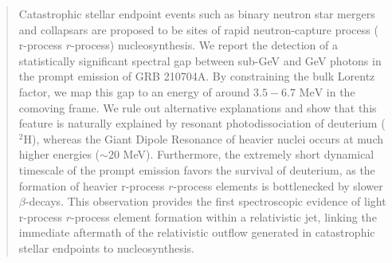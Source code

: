 \documentclass[prd,twocolumn,amsmath,amssymb,aps,linenumbers]{revtex4-2} %
\providecommand{\DIFaddtex}[1]{{\protect\color{blue} \sf #1}} %
\providecommand{\DIFdeltex}[1]{{\protect\color{red} \scriptsize #1}} %
\providecommand{\DIFaddbegin}{} %
\providecommand{\DIFaddend}{} %
\providecommand{\DIFdelbegin}{} %
\providecommand{\DIFdelend}{} %
\providecommand{\DIFadd}[1]{\texorpdfstring{\DIFaddtex{#1}}{#1}} %
\providecommand{\DIFdel}[1]{\texorpdfstring{\DIFdeltex{#1}}{}} %
\newcommand{\DIFscaledelfig}{0.5}
\newlength{\DIFdelgraphicswidth} %
\newlength{\DIFdelgraphicsheight} %
\newcommand{\DIFaddincludegraphics}[2][]{{\color{blue}\fbox{\DIFOincludegraphics[#1]{#2}}}} %
\newcommand{\DIFdelincludegraphics}[2][]{%
\sbox{\DIFdelgraphicsbox}{\DIFOincludegraphics[#1]{#2}}%
\settoboxwidth{\DIFdelgraphicswidth}{\DIFdelgraphicsbox} %
\settoboxtotalheight{\DIFdelgraphicsheight}{\DIFdelgraphicsbox} %
\scalebox{\DIFscaledelfig}{%
\parbox[b]{\DIFdelgraphicswidth}{\usebox{\DIFdelgraphicsbox}\\[-\baselineskip] \rule{\DIFdelgraphicswidth}{0em}}\llap{\resizebox{\DIFdelgraphicswidth}{\DIFdelgraphicsheight}{%
\setlength{\unitlength}{\DIFdelgraphicswidth}%
\begin{picture}(1,1)%
\thicklines\linethickness{2pt} %
{\color[rgb]{1,0,0}\put(0,0){\framebox(1,1){}}}%
{\color[rgb]{1,0,0}\put(0,0){\line( 1,1){1}}}%
{\color[rgb]{1,0,0}\put(0,1){\line(1,-1){1}}}%
\end{picture}%
}\hspace*{3pt}}} %
} %
\DeclareRobustCommand{\DIFaddbegin}{\DIFOaddbegin \let\includegraphics\DIFaddincludegraphics} %
\DeclareRobustCommand{\DIFaddend}{\DIFOaddend \let\includegraphics\DIFOincludegraphics} %
\DeclareRobustCommand{\DIFdelbegin}{\DIFOdelbegin \let\includegraphics\DIFdelincludegraphics} %
\DeclareRobustCommand{\DIFdelend}{\DIFOaddend \let\includegraphics\DIFOincludegraphics} %
\begin{document}
\begin{abstract}
Catastrophic stellar endpoint events such as binary neutron star mergers and collapsars are proposed to be sites of rapid neutron-capture process (\DIFdelbegin \DIFdel{r-process}\DIFdelend \DIFaddbegin \DIFadd{$r$-process}\DIFaddend ) nucleosynthesis. We report the detection of a statistically significant spectral gap between sub-GeV and GeV photons in the prompt emission of GRB 210704A. By constraining the bulk Lorentz factor, we map this gap to an energy of around $3.5 - 6.7 \text{ MeV}$ in the comoving frame. We rule out alternative explanations and show that this feature is naturally explained by resonant photodissociation of deuterium ($^2$H), whereas the Giant Dipole Resonance of heavier nuclei occurs at much higher energies ($\sim 20$ MeV). Furthermore, the extremely short dynamical timescale of \DIFaddbegin \DIFadd{the }\DIFaddend prompt emission favors the survival of deuterium, as the formation of heavier \DIFdelbegin \DIFdel{r-process }\DIFdelend \DIFaddbegin \DIFadd{$r$-process }\DIFaddend elements is bottlenecked by slower $\beta$-decays. This observation provides the first spectroscopic evidence of light \DIFdelbegin \DIFdel{r-process }\DIFdelend \DIFaddbegin \DIFadd{$r$-process }\DIFaddend element formation within a relativistic jet, linking the immediate aftermath of the relativistic outflow generated in catastrophic stellar endpoints to nucleosynthesis.
\end{abstract}
\end{document}
